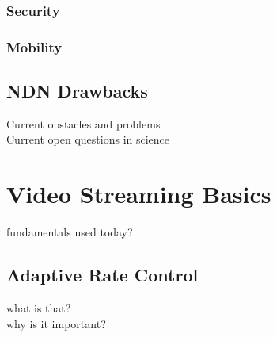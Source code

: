 \subsubsection{Security}

\subsubsection{Mobility}


\subsection{NDN Drawbacks}
Current obstacles and problems \\
Current open questions in science \\

\section{Video Streaming Basics}
fundamentals used today?

\subsection{Adaptive Rate Control}
what is that? \\
why is it important?

